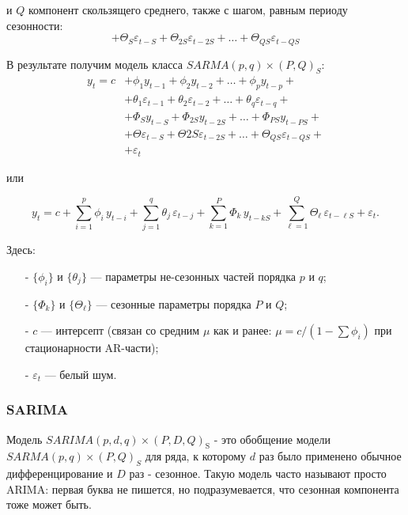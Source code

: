 и $Q$ компонент скользящего среднего, также с шагом, равным периоду сезонности:
\begin{equation*}
    + \Theta_S \varepsilon_{t-S} + \Theta_{2S} \varepsilon_{t-2S} + \dots + \Theta_{QS} \varepsilon_{t-QS}
\end{equation*}

В результате получим модель класса $SARMA(p, q) \times (P, Q)_S$:
\begin{align*}
    y_t = c &+ \phi_1 y_{t-1} + \phi_2 y_{t-2} + \dots + \phi_p y_{t-p} + \\
    &+ \theta_1 \varepsilon_{t-1} + \theta_2 \varepsilon_{t-2} + \dots + \theta_q \varepsilon_{t-q} + \\
    &+ \Phi_S y_{t-S} + \Phi_{2S} y_{t-2S} + \dots + \Phi_{PS} y_{t-PS} + \\
    &+ \Theta \varepsilon_{t-S} + \Theta{2S} \varepsilon_{t-2S} + \dots + \Theta_{QS} \varepsilon_{t-QS} +\\
    &+ \varepsilon_t 
\end{align*}

\begin{flushleft}
    или
\end{flushleft}
\vspace{-5pt}
\begin{equation*}
    y_t = c
    + \sum_{i=1}^p \phi_i\,y_{t-i}
    + \sum_{j=1}^q \theta_j\,\varepsilon_{t-j}
    + \sum_{k=1}^P \Phi_k\,y_{t-kS}
    + \sum_{\ell=1}^Q \Theta_\ell\,\varepsilon_{t-\ell S}
    + \varepsilon_t.
\end{equation*}

Здесь:
\begin{itemize}
    \item[-] \(\{\phi_i\}\) и \(\{\theta_j\}\) — параметры не-сезонных частей порядка \(p\) и \(q\);  
    \item[-] \(\{\Phi_k\}\) и \(\{\Theta_\ell\}\) — сезонные параметры порядка \(P\) и \(Q\);  
    \item[-] \(c\) — интерсепт (связан со средним \(\mu\) как и ранее: \(\mu = c/(1-\sum\phi_i)\) 
    при стационарности AR-части);  
    \item[-] \(\varepsilon_t\) — белый шум.  
\end{itemize}

\subsubsection{SARIMA}

Модель $SARIMA(p, d, q) \times (P, D, Q)_\text{S}$ - это обобщение модели $SARMA(p, q) \times (P, Q)_S$ для ряда, 
к которому $d$ раз было применено обычное дифференцирование и $D$ раз - сезонное. 
Такую модель часто называют просто ARIMA:
первая буква не пишется, но подразумевается, что сезонная компонента тоже может быть.

